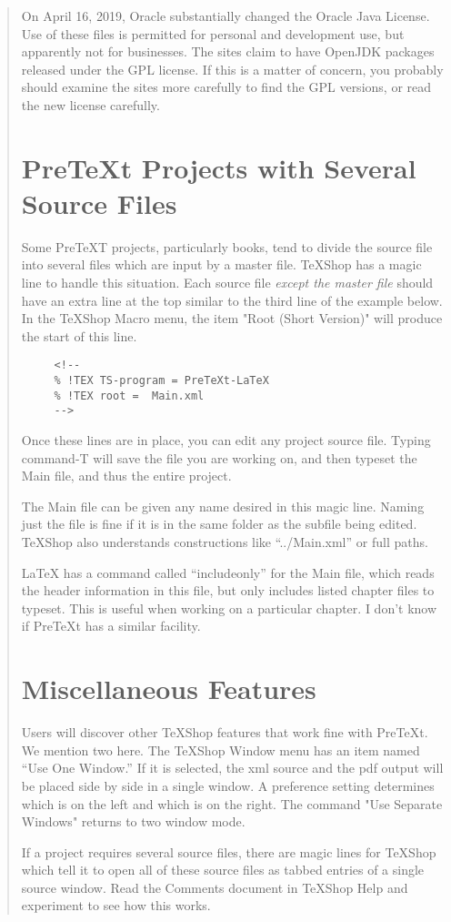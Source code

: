 \documentclass[11pt, oneside]{article}   	%
\begin{document}
\begin{quotation}
On April 16, 2019, Oracle substantially changed the Oracle Java License. Use of these files is permitted for personal and development use, but apparently not for businesses. The sites  claim to have OpenJDK packages released under the GPL license. If this is a matter of concern, you probably should examine the sites more carefully to find the GPL versions, or read the new license carefully.

\section{PreTeXt Projects with Several Source Files} 
Some PreTeXT projects, particularly books, tend to divide the source file into several files which are input by a master file. TeXShop has a magic line to handle this situation. Each source file {\em except the master file} should have an extra line at the top similar to the third line of the example below. In the TeXShop Macro menu, the item "Root (Short Version)" will produce the start of this line.

\begin{verbatim}
     <!--
     % !TEX TS-program = PreTeXt-LaTeX
     % !TEX root =  Main.xml
     -->
\end{verbatim}

Once these lines are in place, you can edit any project source file. Typing command-T will save the file you are working on, and then typeset the Main file, and thus the entire project.

The Main file can be given any name desired in this magic line. Naming just the file is fine if it is in the same folder as the subfile being edited. TeXShop also understands constructions like ``../Main.xml'' or full paths. 

LaTeX has a command called ``includeonly'' for the Main file, which reads the header information in this file, but only includes listed chapter files to typeset. This is useful when working on a particular chapter. I don't know if PreTeXt has a similar facility.

\section{Miscellaneous Features}

Users will discover other TeXShop features that work fine with PreTeXt. We mention two here. The TeXShop Window menu has an item named ``Use One Window.'' If it is selected, the xml source and the pdf output will be placed side by side in a single window. A preference setting determines which is on the left and which is on the right. The command "Use Separate Windows" returns to two window mode.

If a project requires several source files, there are magic lines for TeXShop which tell it to open all of these source files as tabbed entries of a single source window. Read the Comments document in TeXShop Help and experiment to see how this works.

\end{quotation}
\end{document}
